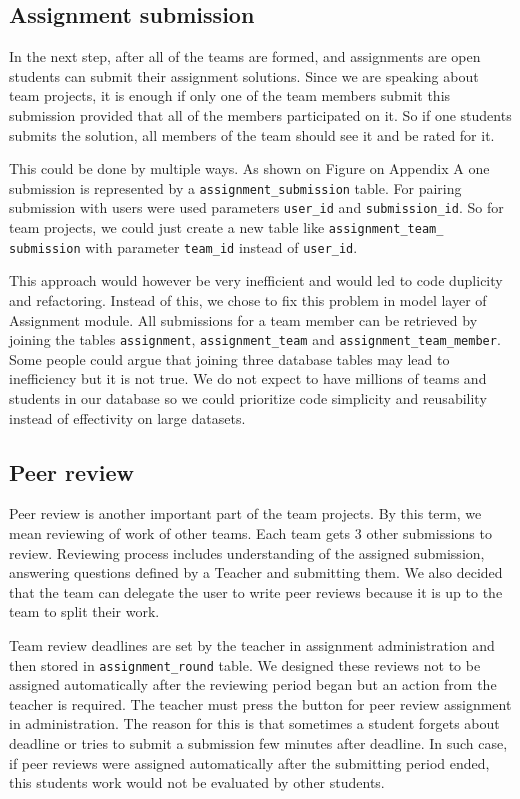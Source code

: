 \subsection{Assignment submission}
In the next step, after all of the teams are formed, and assignments are open students can submit their assignment solutions. Since we are speaking about team projects, it is enough if only one of the team members submit this submission provided that all of the members participated on it. So if one students submits the solution, all members of the team should see it and be rated for it.

This could be done by multiple ways. As shown on Figure on Appendix A one submission is represented by a \texttt{assignment\_submission} table. For pairing submission with users were used parameters \texttt{user\_id} and \texttt{submission\_id}. So for team projects, we could just create a new table like \texttt{assignment\_team\_ submission} with parameter \texttt{team\_id} instead of \texttt{user\_id}.

This approach would however be very inefficient and would led to code duplicity and refactoring. Instead of this, we chose to fix this problem in model layer of Assignment module. All submissions for a team member can be retrieved by joining the tables  \texttt{assignment}, \texttt{assignment\_team} and \texttt{assignment\_team\_member}. Some people could argue that joining three database tables may lead to inefficiency but it is not true. We do not expect to have millions of teams and students in our database so we could prioritize code simplicity and reusability instead of effectivity on large datasets.

\subsection{Peer review}
\label{sec:peerreview}
Peer review is another important part of the team projects. By this term, we mean reviewing of work of other teams. Each team gets 3 other submissions to review. Reviewing process includes understanding of the assigned submission, answering questions defined by a Teacher and submitting them. We also decided that the team can delegate the user to  write peer reviews because it is up to the team to split their work.

Team review deadlines are set by the teacher in assignment administration and then stored in \texttt{assignment\_round} table. We designed these reviews not to be assigned automatically after the reviewing period began but an action from the teacher is required. The teacher must press the button for peer review assignment in administration. The reason for this is that sometimes a student forgets about deadline or tries to submit a submission few minutes after deadline. In such case, if peer reviews were assigned automatically after the submitting period ended, this students work would not be evaluated by other students.

